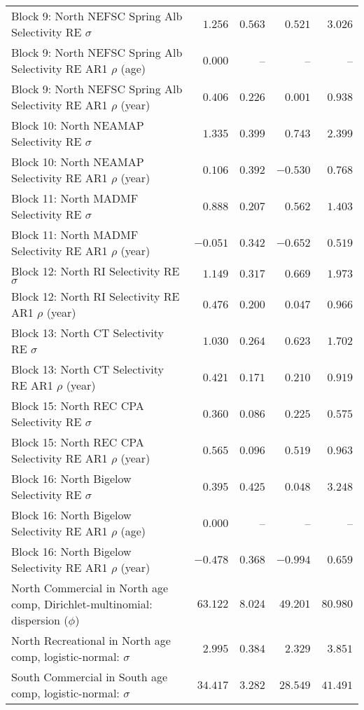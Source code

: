 \documentclass[
]{article}
\begin{document}
\begin{landscape}
\begin{longtable}[t]{lrrrr}
\addlinespace
Block 9: North NEFSC Spring Alb Selectivity RE $\sigma$ & $1.256$ & $0.563$ & $0.521$ & $3.026$\\
Block 9: North NEFSC Spring Alb Selectivity RE AR1 $\rho$ (age) & $0.000$ & -- & -- & --\\
Block 9: North NEFSC Spring Alb Selectivity RE AR1 $\rho$ (year) & $0.406$ & $0.226$ & $0.001$ & $0.938$\\
Block 10: North NEAMAP Selectivity RE $\sigma$ & $1.335$ & $0.399$ & $0.743$ & $2.399$\\
Block 10: North NEAMAP Selectivity RE AR1 $\rho$ (year) & $0.106$ & $0.392$ & $-0.530$ & $0.768$\\
\addlinespace
Block 11: North MADMF Selectivity RE $\sigma$ & $0.888$ & $0.207$ & $0.562$ & $1.403$\\
Block 11: North MADMF Selectivity RE AR1 $\rho$ (year) & $-0.051$ & $0.342$ & $-0.652$ & $0.519$\\
Block 12: North RI Selectivity RE $\sigma$ & $1.149$ & $0.317$ & $0.669$ & $1.973$\\
Block 12: North RI Selectivity RE AR1 $\rho$ (year) & $0.476$ & $0.200$ & $0.047$ & $0.966$\\
Block 13: North CT Selectivity RE $\sigma$ & $1.030$ & $0.264$ & $0.623$ & $1.702$\\
\addlinespace
Block 13: North CT Selectivity RE AR1 $\rho$ (year) & $0.421$ & $0.171$ & $0.210$ & $0.919$\\
Block 15: North REC CPA Selectivity RE $\sigma$ & $0.360$ & $0.086$ & $0.225$ & $0.575$\\
Block 15: North REC CPA Selectivity RE AR1 $\rho$ (year) & $0.565$ & $0.096$ & $0.519$ & $0.963$\\
Block 16: North Bigelow Selectivity RE $\sigma$ & $0.395$ & $0.425$ & $0.048$ & $3.248$\\
Block 16: North Bigelow Selectivity RE AR1 $\rho$ (age) & $0.000$ & -- & -- & --\\
\addlinespace
Block 16: North Bigelow Selectivity RE AR1 $\rho$ (year) & $-0.478$ & $0.368$ & $-0.994$ & $0.659$\\
North Commercial in North age comp, Dirichlet-multinomial: dispersion ($\phi$) & $63.122$ & $8.024$ & $49.201$ & $80.980$\\
North Recreational in North age comp, logistic-normal: $\sigma$ & $2.995$ & $0.384$ & $2.329$ & $3.851$\\
South Commercial in South age comp, logistic-normal: $\sigma$ & $34.417$ & $3.282$ & $28.549$ & $41.491$\\

\end{longtable}
\end{landscape}
\end{document}

